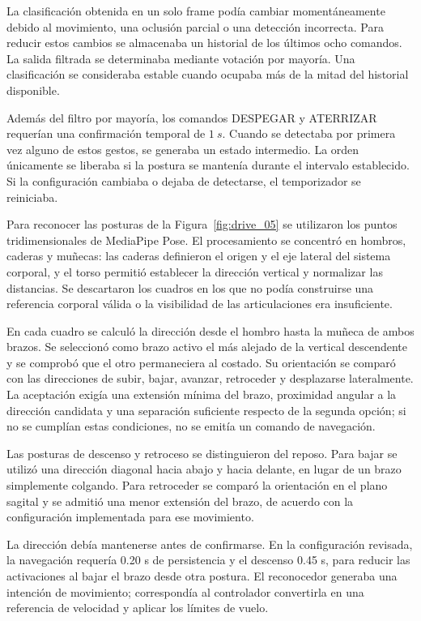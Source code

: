 La clasificación obtenida en un solo frame podía cambiar momentáneamente debido al movimiento, una oclusión parcial o una detección incorrecta. Para reducir estos cambios se almacenaba un historial de los últimos ocho comandos. La salida filtrada se determinaba mediante votación por mayoría. Una clasificación se consideraba estable cuando ocupaba más de la mitad del historial disponible.

Además del filtro por mayoría, los comandos DESPEGAR y ATERRIZAR requerían una confirmación temporal de $1\ s$. Cuando se detectaba por primera vez alguno de estos gestos, se generaba un estado intermedio. La orden únicamente se liberaba si la postura se mantenía durante el intervalo establecido. Si la configuración cambiaba o dejaba de detectarse, el temporizador se reiniciaba.

Para reconocer las posturas de la Figura~\ref{fig:drive_05} se utilizaron los puntos tridimensionales de MediaPipe Pose. El procesamiento se concentró en hombros, caderas y muñecas: las caderas definieron el origen y el eje lateral del sistema corporal, y el torso permitió establecer la dirección vertical y normalizar las distancias. Se descartaron los cuadros en los que no podía construirse una referencia corporal válida o la visibilidad de las articulaciones era insuficiente.

En cada cuadro se calculó la dirección desde el hombro hasta la muñeca de ambos brazos. Se seleccionó como brazo activo el más alejado de la vertical descendente y se comprobó que el otro permaneciera al costado. Su orientación se comparó con las direcciones de subir, bajar, avanzar, retroceder y desplazarse lateralmente. La aceptación exigía una extensión mínima del brazo, proximidad angular a la dirección candidata y una separación suficiente respecto de la segunda opción; si no se cumplían estas condiciones, no se emitía un comando de navegación.

Las posturas de descenso y retroceso se distinguieron del reposo. Para bajar se utilizó una dirección diagonal hacia abajo y hacia delante, en lugar de un brazo simplemente colgando. Para retroceder se comparó la orientación en el plano sagital y se admitió una menor extensión del brazo, de acuerdo con la configuración implementada para ese movimiento.

La dirección debía mantenerse antes de confirmarse. En la configuración revisada, la navegación requería 0.20 s de persistencia y el descenso 0.45 s, para reducir las activaciones al bajar el brazo desde otra postura. El reconocedor generaba una intención de movimiento; correspondía al controlador convertirla en una referencia de velocidad y aplicar los límites de vuelo.

